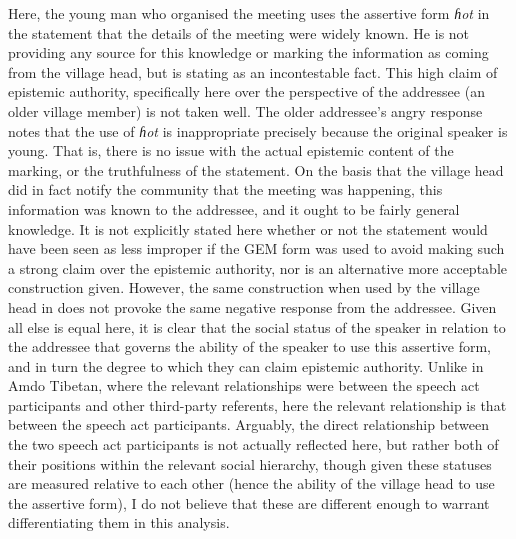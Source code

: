 Here, the young man who organised the meeting uses the assertive form \textit{ɦot} in the statement that the details of the meeting were widely known. He is not providing any source for this knowledge or marking the information as coming from the village head, but is stating as an incontestable fact. This high claim of epistemic authority, specifically here over the perspective of the addressee (an older village member) is not taken well. The older addressee's angry response notes that the use of \textit{ɦot} is inappropriate precisely because the original speaker is young. That is, there is no issue with the actual epistemic content of the marking, or the truthfulness of the statement. On the basis that the village head did in fact notify the community that the meeting was happening, this information was known to the addressee, and it ought to be fairly general knowledge. It is not explicitly stated here whether or not the statement would have been seen as less improper if the GEM form was used to avoid making such a strong claim over the epistemic authority, nor is an alternative more acceptable construction given. However, the same construction when used by the village head in  does not provoke the same negative response from the addressee. Given all else is equal here, it is clear that the social status of the speaker in relation to the addressee that governs the ability of the speaker to use this assertive form, and in turn the degree to which they can claim epistemic authority. Unlike in Amdo Tibetan, where the relevant relationships were between the speech act participants and other third-party referents, here the relevant relationship is that between the speech act participants. Arguably, the direct relationship between the two speech act participants is not actually reflected here, but rather both of their positions within the relevant social hierarchy, though given these statuses are measured relative to each other (hence the ability of the village head to use the assertive form), I do not believe that these are different enough to warrant differentiating them in this analysis.

